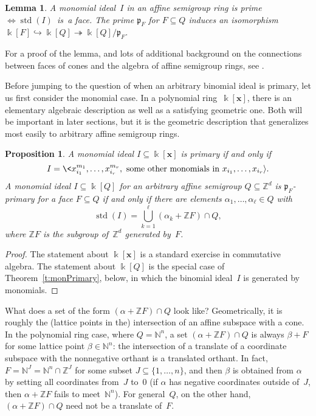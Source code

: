 \documentclass[12pt]{amsart}
\numberwithin{equation}{section}
\newtheorem{lemma}[thm]{Lemma}
\newtheorem{prop}[thm]{Proposition}
\theoremstyle{definition}
\begin{document}
\begin{lemma}\label{l:face}
A monomial ideal~$I$ in an affine semigroup ring is prime ${\Leftrightarrow}
\operatorname{std}(I)$~is~a face.  The prime ${\mathfrak{p}}_F$ for $F \subseteq Q$ induces an
isomorphism ${\Bbbk}[F] {\hookrightarrow} {\Bbbk}[Q] {\twoheadrightarrow} {\Bbbk}[Q]/{\mathfrak{p}}_F$.
\end{lemma}

For a proof of the lemma, and lots of additional background on the
connections between faces of cones and the algebra of affine semigroup
rings, see \cite[\S7.2]{cca}.

Before jumping to the question of when an arbitrary binomial ideal is
primary, let us first consider the monomial case.  In a polynomial
ring~${\Bbbk}[{\mathbf{x}}]$, there is an elementary algebraic description as well
as a satisfying geometric one.  Both will be important in later
sections, but it is the geometric description that generalizes most
easily to arbitrary affine semigroup rings.

\begin{prop}\label{p:monomPrimary}
A monomial ideal $I \subseteq {\Bbbk}[{\mathbf{x}}]$ is primary if and only if
$$  I = \<x_{i_1}^{m_1}, \ldots, x_{i_r}^{m_r}, \text{ some other
  monomials in } x_{i_1}, \ldots, x_{i_r}{\rangle}.
$$
A monomial ideal $I \subseteq {\Bbbk}[Q]$ for an arbitrary affine
semigroup $Q \subseteq {\mathbb{Z}}^d$ is ${\mathfrak{p}}_F$-primary for a face $F
\subseteq Q$ if and only if there are elements
$\alpha_1,\ldots,\alpha_\ell \in Q$ with
$$  \operatorname{std}(I) = \bigcup_{k=1}^\ell (\alpha_k + {\mathbb{Z}} F) \cap Q,
$$
where ${\mathbb{Z}} F$ is the subgroup of~${\mathbb{Z}}^d$ generated by~$F$.
\end{prop}
\begin{proof}
The statement about ${\Bbbk}[{\mathbf{x}}]$ is a standard exercise in commutative
algebra.  The statement about ${\Bbbk}[Q]$ is the special case of
Theorem~\ref{t:monPrimary}, below, in which the binomial ideal~$I$ is
generated by monomials.
\end{proof}

What does a set of the form $(\alpha + {\mathbb{Z}} F) \cap Q$ look like?
Geometrically, it is roughly the (lattice points in the) intersection
of an affine subspace with a cone.  In the polynomial ring case, where
$Q = {\mathbb{N}}^n$, a set $(\alpha + {\mathbb{Z}} F) \cap Q$ is always $\beta + F$ for
some lattice point $\beta \in {\mathbb{N}}^n$: the intersection of a translate
of a coordinate subspace with the nonnegative orthant is a translated
orthant.  In fact, $F = {\mathbb{N}}^J = {\mathbb{N}}^n \cap {\mathbb{Z}}^J$ for some subset $J
\subseteq \{1,\ldots,n\}$, and then $\beta$ is obtained from $\alpha$
by setting all coordinates from~$J$ to~$0$ (if $\alpha$ has negative
coordinates outside of~$J$, then $\alpha + {\mathbb{Z}} F$ fails to
meet~${\mathbb{N}}^n$).  For general~$Q$, on the other hand, $(\alpha + {\mathbb{Z}} F)
\cap Q$ need not be a translate of~$F$.
\end{document}
